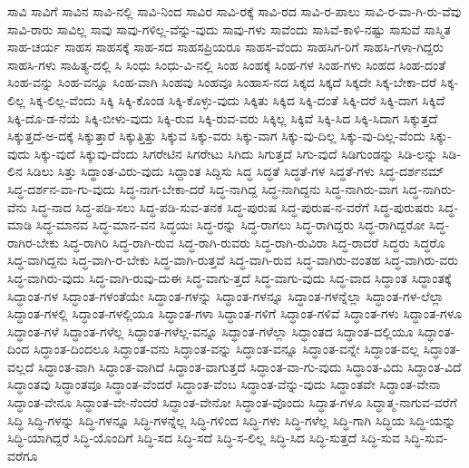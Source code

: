 {ಸಾವಿ
ಸಾವಿಗೆ
ಸಾವಿನ
ಸಾವಿ-ನಲ್ಲಿ
ಸಾವಿ-ನಿಂದ
ಸಾವಿರ
ಸಾವಿ-ರಕ್ಕೆ
ಸಾವಿ-ರದ
ಸಾವಿ-ರ-ಪಾಲು
ಸಾವಿ-ರ-ವಾ-ಗಿ-ರು-ವೆವು
ಸಾವಿ-ರಾರು
ಸಾವಿಲ್ಲ
ಸಾವು
ಸಾವು-ಗಳಿಲ್ಲ-ವೆನ್ನು-ವುದು
ಸಾವು-ಗಳು
ಸಾವೆಂದು
ಸಾಸಿವೆ-ಕಾಳಿ-ನಷ್ಟು
ಸಾಸುವೆ
ಸಾಸ್ಮಿತ
ಸಾಹ-ಚರ್ಯ
ಸಾಹಸ
ಸಾಹಸಕ್ಕೆ
ಸಾಹ-ಸದ
ಸಾಹಸಪ್ರಿಯರೂ
ಸಾಹಸ-ವೆಂದು
ಸಾಹಸಿಗ-ರಿಗೆ
ಸಾಹಸಿ-ಗಳಾ-ಗಿದ್ದರು
ಸಾಹಸಿ-ಗಳು
ಸಾಹಿತ್ಯ-ದಲ್ಲಿ
ಸಿ
ಸಿಂಧು
ಸಿಂಧು-ವಿ-ನಲ್ಲಿ
ಸಿಂಹ
ಸಿಂಹಕ್ಕೆ
ಸಿಂಹ-ಗಳ
ಸಿಂಹ-ಗಳು
ಸಿಂಹದ
ಸಿಂಹ-ದಂತೆ
ಸಿಂಹ-ವನ್ನು
ಸಿಂಹ-ವನ್ನೂ
ಸಿಂಹ-ವಾಗಿ
ಸಿಂಹವು
ಸಿಂಹವೂ
ಸಿಂಹಾಸ-ನದ
ಸಿಕ್ಕದ
ಸಿಕ್ಕದೆ
ಸಿಕ್ಕದೇ
ಸಿಕ್ಕ-ಬೇಕಾ-ದರೆ
ಸಿಕ್ಕ-ಲಿಲ್ಲ
ಸಿಕ್ಕ-ಲಿಲ್ಲ-ವೆಂದು
ಸಿಕ್ಕಿ
ಸಿಕ್ಕಿ-ಕೊಂಡ
ಸಿಕ್ಕಿ-ಕೊಳ್ಳು-ವುದು
ಸಿಕ್ಕಿತು
ಸಿಕ್ಕಿದ
ಸಿಕ್ಕಿ-ದಂತೆ
ಸಿಕ್ಕಿ-ದರೆ
ಸಿಕ್ಕಿ-ದಾಗ
ಸಿಕ್ಕಿದೆ
ಸಿಕ್ಕಿ-ದೊ-ಡ-ನೆಯೆ
ಸಿಕ್ಕಿ-ಬೀಳು-ವುದು
ಸಿಕ್ಕಿ-ರುವ
ಸಿಕ್ಕಿ-ರುವ-ವರು
ಸಿಕ್ಕಿಲ್ಲ
ಸಿಕ್ಕಿವೆ
ಸಿಕ್ಕಿ-ಸಿದ
ಸಿಕ್ಕಿ-ಸಿದಾಗ
ಸಿಕ್ಕುತ್ತದೆ
ಸಿಕ್ಕುತ್ತದೆ-ಅ-ದಕ್ಕೆ
ಸಿಕ್ಕುತ್ತಾರೆ
ಸಿಕ್ಕುತ್ತಿತ್ತು
ಸಿಕ್ಕುವ
ಸಿಕ್ಕು-ವರು
ಸಿಕ್ಕು-ವಾಗ
ಸಿಕ್ಕು-ವು-ದಿಲ್ಲ
ಸಿಕ್ಕು-ವು-ದಿಲ್ಲ-ವೆಂದು
ಸಿಕ್ಕು-ವುದು
ಸಿಕ್ಕು-ವುದೆ
ಸಿಕ್ಕುವು-ದೆಂದು
ಸಿಗರೇಟಿನ
ಸಿಗರೇಟು
ಸಿಗಿದು
ಸಿಗುತ್ತದೆ
ಸಿಗು-ವುದೆ
ಸಿಡಿಗುಂಡನ್ನು
ಸಿಡಿ-ಲನ್ನು
ಸಿಡಿ-ಲಿನ
ಸಿಡಿಲು
ಸಿತ್ತು
ಸಿದ್ಥಾಂತ-ವಿರು-ವುದು
ಸಿದ್ದಾಂತ
ಸಿದ್ದಿಸು
ಸಿದ್ಧ
ಸಿದ್ಧತೆ
ಸಿದ್ಧತೆ-ಗಳ
ಸಿದ್ಧತೆ-ಗಳು
ಸಿದ್ಧ-ದರ್ಶನಮ್
ಸಿದ್ಧ-ದರ್ಶನ-ವಾ-ಗು-ವುದು
ಸಿದ್ಧ-ನಾಗ-ಬೇಕಾ-ದರೆ
ಸಿದ್ಧ-ನಾಗಿದ್ದ
ಸಿದ್ಧ-ನಾಗಿದ್ದನು
ಸಿದ್ಧ-ನಾಗಿರು-ವಾಗ
ಸಿದ್ಧ-ನಾಗಿರು-ವೆನು
ಸಿದ್ಧ-ನಾದ
ಸಿದ್ಧ-ಪಡಿ-ಸಲು
ಸಿದ್ಧ-ಪಡಿ-ಸುವ-ತನಕ
ಸಿದ್ಧ-ಪುರುಷ
ಸಿದ್ಧ-ಪುರುಷ-ನ-ವರೆಗೆ
ಸಿದ್ಧ-ಪುರುಷರು
ಸಿದ್ಧ-ಮಾಡಿ
ಸಿದ್ಧ-ಮಾನವ
ಸಿದ್ಧ-ಮಾನ-ವನ
ಸಿದ್ಧಯಃ
ಸಿದ್ಧ-ರನ್ನು
ಸಿದ್ಧ-ರಾಗಲು
ಸಿದ್ಧ-ರಾಗಿದ್ದರು
ಸಿದ್ಧ-ರಾಗಿದ್ದರೋ
ಸಿದ್ಧ-ರಾಗಿರ-ಬೇಕು
ಸಿದ್ಧ-ರಾಗಿರಿ
ಸಿದ್ಧ-ರಾಗಿ-ರುವ
ಸಿದ್ಧ-ರಾಗಿ-ರುವರು
ಸಿದ್ಧ-ರಾಗಿ-ರುವಿರಾ
ಸಿದ್ಧ-ರಾದರೆ
ಸಿದ್ಧರು
ಸಿದ್ಧರೊ
ಸಿದ್ಧ-ವಾಗಿದ್ದನು
ಸಿದ್ಧ-ವಾಗಿ-ರ-ಬೇಕು
ಸಿದ್ಧ-ವಾಗಿ-ರುತ್ತವೆ
ಸಿದ್ಧ-ವಾಗಿ-ರುವ
ಸಿದ್ಧ-ವಾಗಿರು-ವಂತಹ
ಸಿದ್ಧ-ವಾಗಿರು-ವರು
ಸಿದ್ಧ-ವಾಗಿರು-ವುದು
ಸಿದ್ಧ-ವಾಗಿ-ರುವು-ದುಈ
ಸಿದ್ಧ-ವಾಗು-ತ್ತದೆ
ಸಿದ್ಧ-ವಾಗು-ವುದು
ಸಿದ್ಧ-ವಾದ
ಸಿದ್ಧಾಂತ
ಸಿದ್ಧಾಂತಕ್ಕೆ
ಸಿದ್ಧಾಂತ-ಗಳ
ಸಿದ್ಧಾಂತ-ಗಳಂತೆಯೇ
ಸಿದ್ಧಾಂತ-ಗಳನ್ನು
ಸಿದ್ಧಾಂತ-ಗಳನ್ನೂ
ಸಿದ್ಧಾಂತ-ಗಳನ್ನೆಲ್ಲಾ
ಸಿದ್ಧಾಂತ-ಗಳ-ಲೆಲ್ಲಾ
ಸಿದ್ಧಾಂತ-ಗಳಲ್ಲಿ
ಸಿದ್ಧಾಂತ-ಗಳಲ್ಲಿಯೂ
ಸಿದ್ಧಾಂತ-ಗಳಾ
ಸಿದ್ಧಾಂತ-ಗಳಿಗೆ
ಸಿದ್ಧಾಂತ-ಗಳಿವೆ
ಸಿದ್ಧಾಂತ-ಗಳು
ಸಿದ್ಧಾಂತ-ಗಳೂ
ಸಿದ್ಧಾಂತ-ಗಳೆ
ಸಿದ್ಧಾಂತ-ಗಳೆಲ್ಲ
ಸಿದ್ಧಾಂತ-ಗಳೆಲ್ಲ-ವನ್ನೂ
ಸಿದ್ಧಾಂತ-ಗಳೆಲ್ಲಾ
ಸಿದ್ಧಾಂತದ
ಸಿದ್ಧಾಂತ-ದಲ್ಲಿಯೂ
ಸಿದ್ಧಾಂತ-ದಿಂದ
ಸಿದ್ಧಾಂತ-ದಿಂದಲೂ
ಸಿದ್ಧಾಂತ-ವನು
ಸಿದ್ಧಾಂತ-ವನ್ನು
ಸಿದ್ಧಾಂತ-ವನ್ನೂ
ಸಿದ್ಧಾಂತ-ವನ್ನೇ
ಸಿದ್ಧಾಂತ-ವಲ್ಲ
ಸಿದ್ಧಾಂತ-ವಲ್ಲದೆ
ಸಿದ್ಧಾಂತ-ವಾಗಿ
ಸಿದ್ಧಾಂತ-ವಾಗಿದೆ
ಸಿದ್ಧಾಂತ-ವಾಗುತ್ತದೆ
ಸಿದ್ಧಾಂತ-ವಾ-ಗು-ವುದು
ಸಿದ್ಧಾಂತ-ವಿದು
ಸಿದ್ಧಾಂತ-ವಿದೆ
ಸಿದ್ಧಾಂತವು
ಸಿದ್ಧಾಂತವೂ
ಸಿದ್ಧಾಂತ-ವೆಂದರೆ
ಸಿದ್ಧಾಂತ-ವೆಂಬ
ಸಿದ್ಧಾಂತ-ವೆನ್ನು-ವುದು
ಸಿದ್ಧಾಂತವೇ
ಸಿದ್ಧಾಂತ-ವೇನಾ
ಸಿದ್ಧಾಂತ-ವೇನೂ
ಸಿದ್ಧಾಂತ-ವೇ-ನೆಂದರೆ
ಸಿದ್ಧಾಂತ-ವೇನೋ
ಸಿದ್ಧಾಂತ-ವೊಂದು
ಸಿದ್ಧಾತ-ಗಳೂ
ಸಿದ್ಧಾತ್ಮ-ನಾಗುವ-ವರೆಗೆ
ಸಿದ್ಧಿ
ಸಿದ್ಧಿ-ಗಳನ್ನು
ಸಿದ್ಧಿ-ಗಳನ್ನೂ
ಸಿದ್ಧಿ-ಗಳನ್ನೆಲ್ಲ
ಸಿದ್ಧಿ-ಗಳಿಂದ
ಸಿದ್ಧಿ-ಗಳು
ಸಿದ್ಧಿ-ಗಳೆಲ್ಲ
ಸಿದ್ಧಿ-ಗಾಗಿ
ಸಿದ್ಧಿಯ
ಸಿದ್ಧಿ-ಯನ್ನು
ಸಿದ್ಧಿ-ಯಾಗಿದ್ದರೆ
ಸಿದ್ಧಿ-ಯೊಂದಿಗೆ
ಸಿದ್ಧಿ-ಸದ
ಸಿದ್ಧಿ-ಸದೆ
ಸಿದ್ಧಿ-ಸ-ಲಿಲ್ಲ
ಸಿದ್ಧಿ-ಸಿದ
ಸಿದ್ಧಿ-ಸುತ್ತದೆ
ಸಿದ್ಧಿ-ಸುವ
ಸಿದ್ಧಿ-ಸುವ-ವರೆಗೂ
}
